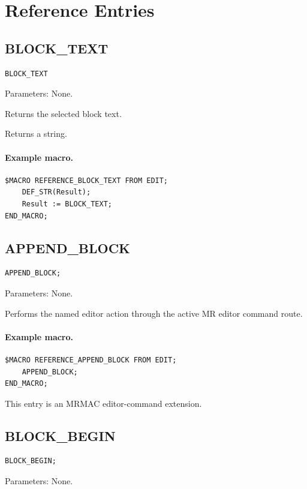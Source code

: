 \documentclass[a4paper,10pt,twoside,openany]{book}
\newenvironment{mrmacextension}{\begin{changebar}}{\end{changebar}}
\begin{document}
\section{Reference Entries}

\label{prim:intrinsic-block-text}
\subsection*{BLOCK\_TEXT}
\begin{verbatim}
BLOCK_TEXT
\end{verbatim}
Parameters: None.

Returns the selected block text.

Returns a string.

\paragraph{Example macro.}
\begin{verbatim}
$MACRO REFERENCE_BLOCK_TEXT FROM EDIT;
    DEF_STR(Result);
    Result := BLOCK_TEXT;
END_MACRO;
\end{verbatim}

\label{prim:procedure-append-block}
\subsection*{APPEND\_BLOCK}
\begin{verbatim}
APPEND_BLOCK;
\end{verbatim}
Parameters: None.

Performs the named editor action through the active MR editor command route.

\paragraph{Example macro.}
\begin{verbatim}
$MACRO REFERENCE_APPEND_BLOCK FROM EDIT;
    APPEND_BLOCK;
END_MACRO;
\end{verbatim}

\begin{mrmacextension}
This entry is an MRMAC editor-command extension.
\end{mrmacextension}

\label{prim:procedure-block-begin}
\subsection*{BLOCK\_BEGIN}
\begin{verbatim}
BLOCK_BEGIN;
\end{verbatim}
Parameters: None.
\end{document}
